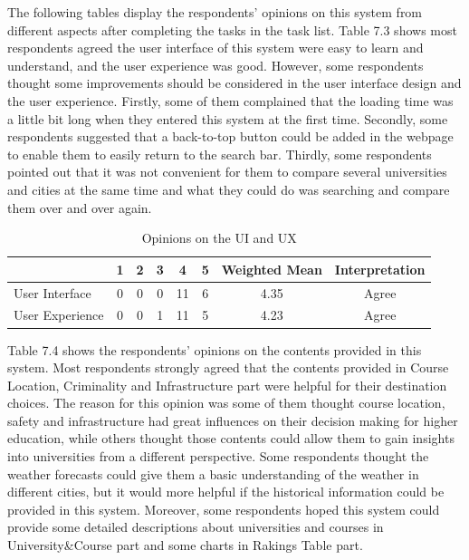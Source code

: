 The following tables display the respondents’ opinions on this system from different aspects after completing the tasks in the task list. Table 7.3 shows most respondents agreed the user interface of this system were easy to learn and understand, and the user experience was good. However, some respondents thought some improvements should be considered in the user interface design and the user experience. Firstly, some of them complained that the loading time was a little bit long when they entered this system at the first time. Secondly, some respondents suggested that a back-to-top button could be added in the webpage to enable them to easily return to the search bar. Thirdly, some respondents pointed out that it was not convenient for them to compare several universities and cities at the same time and what they could do was searching and compare them over and over again. 


\begin{table}[H]
\centering
\caption{Opinions on the UI and UX
}
\label{my-label}
\begin{tabular}{|p{4cm}|c|c|c|c|c|c|c|}
\hline
                & \textbf{1} & \textbf{2} & \textbf{3} & \textbf{4} & \textbf{5} & \textbf{Weighted Mean} & \textbf{Interpretation} \\ \hline
User Interface  & 0          & 0          & 0          & 11         & 6          & 4.35                   & Agree                   \\ \hline
User Experience & 0          & 0          & 1          & 11         & 5          & 4.23                   & Agree                   \\ \hline
\end{tabular}
\end{table}


Table 7.4 shows the respondents’ opinions on the contents provided in this system. Most respondents strongly agreed that the contents provided in Course Location, Criminality and Infrastructure part were helpful for their destination choices.  The reason for this opinion was some of them thought course location, safety and infrastructure had great influences on their decision making for higher education, while others thought those contents could allow them to gain insights into universities from a different perspective. Some respondents thought the weather forecasts could give them a basic understanding of the weather in different cities, but it would more helpful if the historical information could be provided in this system. Moreover, some respondents hoped this system could provide some detailed descriptions about universities and courses in University\&Course part and some charts in Rakings Table part.

